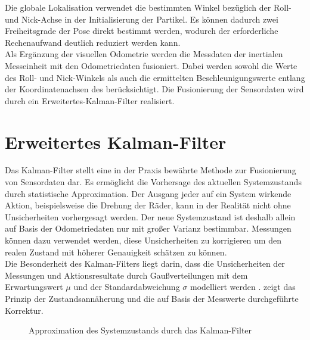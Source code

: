Die globale Lokalisation verwendet die bestimmten Winkel bezüglich der Roll- und Nick-Achse in der Initialisierung der Partikel. Es können dadurch zwei Freiheitsgrade der Pose direkt bestimmt werden, wodurch der erforderliche Rechenaufwand deutlich reduziert werden kann.\\

Als Ergänzung der visuellen Odometrie werden die Messdaten der inertialen Messeinheit mit den Odometriedaten fusioniert. Dabei werden sowohl die Werte des Roll- und Nick-Winkels als auch die ermittelten Beschleunigungswerte entlang der Koordinatenachsen des  berücksichtigt. Die Fusionierung der Sensordaten wird durch ein Erweitertes-Kalman-Filter realisiert.

\section{Erweitertes Kalman-Filter}
\label{chap.kalman}
Das Kalman-Filter \cite{Kalman1960} stellt eine in der Praxis bewährte Methode zur Fusionierung von Sensordaten dar. Es ermöglicht die Vorhersage des aktuellen Systemzustands durch statistische Approximation. Der Ausgang jeder auf ein System wirkende Aktion, beispielsweise die Drehung der Räder, kann in der Realität nicht ohne Unsicherheiten vorhergesagt werden. Der neue Systemzustand ist deshalb allein auf Basis der Odometriedaten nur mit großer Varianz bestimmbar. Messungen können dazu verwendet werden, diese Unsicherheiten zu korrigieren um den realen Zustand mit höherer Genauigkeit schätzen zu können.\\

Die Besonderheit des Kalman-Filters liegt darin, dass die Unsicherheiten der Messungen und Aktionsresultate durch Gaußverteilungen mit dem Erwartungswert $\mu$ und der Standardabweichung $\sigma$ modelliert werden \cite{Hertzberg2012}.  
zeigt das Prinzip der Zustandsannäherung und die auf Basis der Messwerte durchgeführte Korrektur. 

\begin{figure}[ht]
	\begin{center}%
		\caption{Approximation des Systemzustands durch das Kalman-Filter}
		\label{fig.kalman}
	\end{center}
	\vspace*{-8mm}
\end{figure}

